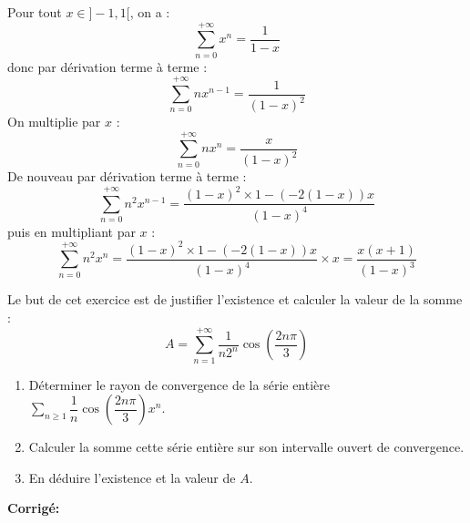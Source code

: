 \documentclass[a4paper,twoside,french,11pt]{VcCours}
\newcommand{\Sum}[2]{\sum_{#1}^{#2}}
\newcommand{\corr}{\textbf{Corrigé:}}
\begin{document}
Pour tout $x \in ]-1,1[$, on a :
$$ \sum_{n=0}^{+\infty}x^n  =  \dfrac{1}{1-x} $$
donc par dérivation terme à terme :
$$ \sum_{n=0}^{+\infty} nx^{n-1}  =  \dfrac{1}{(1-x)^2} $$
On multiplie par $x$ :
$$ \sum_{n=0}^{+\infty} nx^{n}  =  \dfrac{x}{(1-x)^2} $$
De nouveau par dérivation terme à terme :
$$ \sum_{n=0}^{+\infty} n^2 x^{n-1} = \dfrac{(1-x)^2\times 1-(-2(1-x))x}{(1-x)^4}$$
puis en multipliant par $x$ :
$$ \sum_{n=0}^{+\infty} n^2 x^{n}= \dfrac{(1-x)^2\times 1-(-2(1-x))x}{(1-x)^4} \times x  = \dfrac{x(x+1)}{(1-x)^3}$$

\begin{Exercice}[$\bigstar$]{} Le but de cet exercice est de justifier l'existence et calculer la valeur de la somme :  
\[
A=\sum_{n=1}^{+\infty}\dfrac{1}{n2^n}\cos\left(\dfrac{2n\pi}{3}\right)
\]
\begin{enumerate}
\item Déterminer le rayon de convergence de la série entière $\Sum{n \geq 1}{} \dfrac{1}{n}\cos\left(\dfrac{2n\pi}{3}\right)x^n$.
\item Calculer la somme cette série entière sur son intervalle ouvert de convergence.
\item En déduire l'existence et la valeur de $A$.
\end{enumerate}
\end{Exercice}

\corr 
\end{document}
